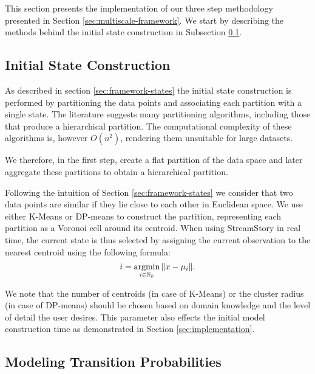 This section presents the implementation of our three step methodology presented in Section \ref{sec:multiscale-framework}.
We start by describing the methods behind the initial state construction in Subsection \ref{sec:state-construction-impl}. \lstopar{[TODO]}

\subsection{Initial State Construction}
\label{sec:state-construction-impl}

As described in section \ref{sec:framework-states} the initial state construction is performed by partitioning
the data points and associating each partition with a single state. The literature suggests many partitioning
algorithms, including those that produce a hierarchical partition. The computational complexity of these algorithms
is, however $O(n^2)$, rendering them unsuitable for large datasets.

We therefore, in the first step, create a flat partition of the data space and later aggregate these partitions
to obtain a hierarchical partition.

Following the intuition of Section \ref{sec:framework-states} we consider that two data points are similar if they lie close
to each other in Euclidean space. 
We use either K-Means or DP-means \cite{DBLP:journals/corr/abs-1111-0352} to construct the partition, representing each 
partition as a Voronoi cell around its centroid. When using StreamStory in real time, the current state is thus
selected by assigning the current observation to the nearest centroid using the following formula:
\begin{equation}
	\nonumber
	i = \argmin_{i \in \mathbb{N}_k} \|x - \mu_i\|.
\end{equation}

We note that the number of centroids (in case of K-Means) or the cluster radius (in case of DP-means) should
be chosen based on domain knowledge and the level of detail the user desires. This parameter also effects the 
initial model construction time as demonstrated in Section \ref{sec:implementation}.

\subsection{Modeling Transition Probabilities}
\label{sec:transition-probs-impl}


